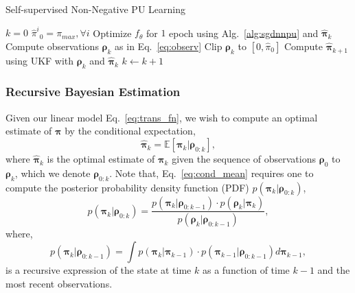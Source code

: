 \begin{algorithm}[t]
\caption{Self-supervised Non-Negative PU Learning}
\label{alg:prior_estim}
\begin{algorithmic}[1]
\State $k = 0$
\State $ {\hat{\pi}^i}_{0} = \pi_{max}, \forall i$
    \State Optimize $f_\theta$ for $1$ epoch using Alg.~\ref{alg:sgdnnpu} and $\bm{\hat{\pi}}_{k}$
    \State Compute observations $\bm{\rho}_k$ as in Eq.~\eqref{eq:observ}
    \State Clip $\bm{\rho}_{k}$ to $[0,\hat \pi_{0}]$
    \State Compute $\bm{\hat\pi}_{k+1}$ using UKF with $\bm{\rho}_{k}$ and $\bm{\hat\pi}_{k}$
    \State	 $k \gets k+1$
\EndWhile
\end{algorithmic}
\end{algorithm}

\subsubsection{Recursive Bayesian Estimation}
Given our linear model Eq.~\eqref{eq:trans_fn}, we wish to compute an optimal estimate of $\bm\pi$ by the conditional expectation,
\begin{equation}
  \label{eq:cond_mean}
\bm{\hat\pi}_{k} = \mathbb{E}[\bm{\pi}_{k} | \bm{\rho}_{0:k}],
\end{equation}
\noindent
where $\bm{\hat\pi}_k$ is the optimal estimate of $\bm{\pi}_{k}$ given the sequence of observations $\bm{\rho}_{0}$ to $\bm{\rho}_{k}$, which we denote $\bm{\rho}_{0:k}$. Note that, Eq.~\eqref{eq:cond_mean} requires one to compute the posterior probability density function (PDF) $p(\bm{\pi}_{k}|\bm{\rho}_{0:k})$, 
\begin{equation}
  \label{eq:aposteriori}
  p(\bm{\pi}_{k}|\bm{\rho}_{0:k}) = \frac{p(\bm{\pi}_{k}|\bm{\rho}_{0:k-1})\cdot p(\bm{\rho}_{k}|\bm{\pi}_{k})}{p(\bm{\rho}_{k}|\bm{\rho}_{0:k-1})},
\end{equation}
\noindent where,
\begin{equation}
  \label{eq:prior}
  p(\bm{\pi}_{k}|\bm{\rho}_{0:k-1}) = \int p(\bm{\pi}_{k}|\bm{\pi}_{k-1}) \cdot p(\bm{\pi}_{k-1}|\bm{\rho}_{0:k-1}) d\bm{\pi}_{k-1},
\end{equation}
\noindent
is a recursive expression of the state at time $k$ as a function of time $k-1$ and the most recent observations.

